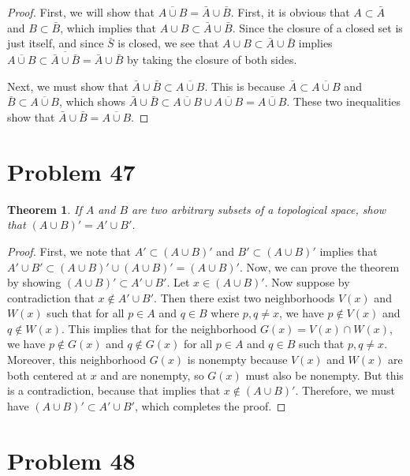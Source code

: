 \documentclass[psamsfonts]{amsart}
\newtheorem{thm}{Theorem}[section]
\theoremstyle{definition}
\theoremstyle{remark}
\numberwithin{equation}{section}
\begin{document}
\begin{proof}
First, we will show that $\overline{A \cup B} = \bar{A} \cup \bar{B}$. First, it is obvious that $A \subset \bar{A}$ and $B \subset \bar{B}$, which implies that $A \cup B \subset \bar{A} \cup \bar{B}$. Since the closure of a closed set is just itself, and since $\bar{S}$ is closed, we see that $A \cup B \subset \bar{A} \cup \bar{B}$ implies $\overline{A \cup B} \subset \overline{\bar{A} \cup \bar{B}} = \bar{A} \cup \bar{B}$ by taking the closure of both sides. 

Next, we must show that $\bar{A} \cup \bar{B} \subset \overline{A \cup B}$. This is because $\bar{A} \subset \overline{A \cup B}$ and $\bar{B} \subset \overline{A \cup B}$, which shows $\bar{A} \cup \bar{B} \subset \overline{A \cup B} \cup \overline{A \cup B} = \overline{A \cup B}$. These two inequalities show that $\bar{A} \cup \bar{B} = \overline{A \cup B}$.
\end{proof}

\section{Problem 47}

\begin{thm}
If $A$ and $B$ are two arbitrary subsets of a topological space, show that $(A \cup B)' = A' \cup B'$. 
\end{thm}

\begin{proof}
First, we note that $A' \subset (A \cup B)'$ and $B' \subset (A \cup B)'$ implies that $A' \cup B' \subset (A \cup B)' \cup (A \cup B)' = (A \cup B)'$. Now, we can prove the theorem by showing $(A \cup B)' \subset A' \cup B'$. Let $x \in (A \cup B)'$. Now suppose by contradiction that $x \notin A' \cup B'$. Then there exist two neighborhoods $V(x)$ and $W(x)$ such that for all $p \in A$ and $q \in B$ where $p,q \neq x$, we have $p \notin V(x)$ and $q \notin W(x)$. This implies that for the neighborhood $G(x) = V(x) \cap W(x)$, we have $p \notin G(x)$ and $q \notin G(x)$ for all $p \in A$ and $q \in B$ such that $p,q \neq x$. Moreover, this neighborhood $G(x)$ is nonempty because $V(x)$ and $W(x)$ are both centered at $x$ and are nonempty, so $G(x)$ must also be nonempty. But this is a contradiction, because that implies that $x \notin (A \cup B)'$. Therefore, we must have $(A \cup B)' \subset A' \cup B'$, which completes the proof.
\end{proof}

\section{Problem 48}
\end{document}
